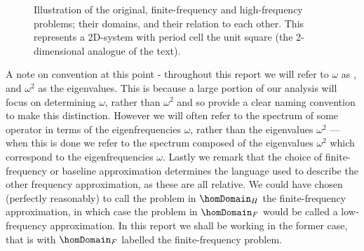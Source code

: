 \begin{figure} [b!]
	\caption{Illustration of the original, finite-frequency and high-frequency problems; their domains, and their relation to each other. This represents a 2D-system with period cell the unit square (the 2-dimensional analogue of the text). \label{fig:AsymRegimeDiagram}}
\end{figure} \newline

A note on convention at this point - throughout this report we will refer to $\omega$ as , and $\omega^{2}$ as the eigenvalues.
This is because a large portion of our analysis will focus on determining $\omega$, rather than $\omega^{2}$ and so provide a clear naming convention to make this distinction.
However we will often refer to the spectrum of some operator in terms of the eigenfrequencies $\omega$, rather than the eigenvalues $\omega^{2}$ --- when this is done we refer to the spectrum composed of the eigenvalues $\omega^{2}$ which correspond to the eigenfrequencies $\omega$.
Lastly we remark that the choice of finite-frequency or baseline approximation determines the language used to describe the other frequency approximation, as these are all relative.
We could have chosen (perfectly reasonably) to call the problem in $\homDomain_{H}$ the finite-frequency approximation, in which case the problem in $\homDomain_{F}$ would be called a low-frequency approximation. 
In this report we shall be working in the former case, that is with $\homDomain_{F}$ labelled the finite-frequency problem. \newline


